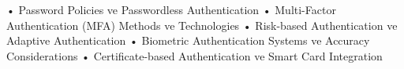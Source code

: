 • Password Policies ve Passwordless Authentication
• Multi-Factor Authentication (MFA) Methods ve Technologies
• Risk-based Authentication ve Adaptive Authentication
• Biometric Authentication Systems ve Accuracy Considerations
• Certificate-based Authentication ve Smart Card Integration
